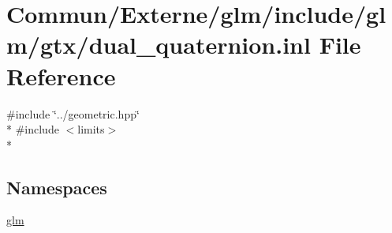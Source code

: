 \hypertarget{dual__quaternion_8inl}{}\section{Commun/\+Externe/glm/include/glm/gtx/dual\+\_\+quaternion.inl File Reference}
\label{dual__quaternion_8inl}
{\ttfamily \#include \char`\"{}../geometric.\+hpp\char`\"{}}\\*
{\ttfamily \#include $<$limits$>$}\\*
\subsection*{Namespaces}
\begin{DoxyCompactItemize}
\item 
 \hyperlink{namespaceglm}{glm}
\end{DoxyCompactItemize}
